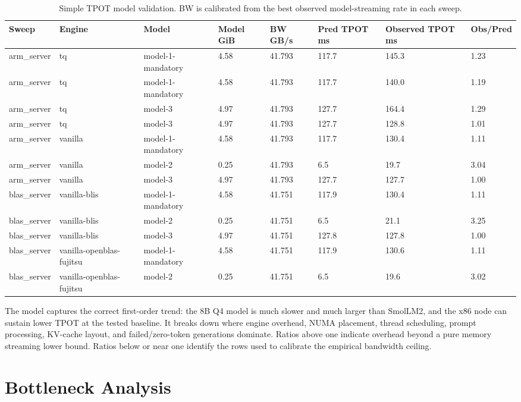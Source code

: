 \documentclass[11pt,a4paper]{article}
\begin{document}
\begin{table}[htbp]
\centering
\small
\begin{tabular}{llllllll}
\hline
Sweep & Engine & Model & Model GiB & BW GB/s & Pred TPOT ms & Observed TPOT ms & Obs/Pred \\
\hline
arm\_server & tq & model-1-mandatory & 4.58 & 41.793 & 117.7 & 145.3 & 1.23 \\
arm\_server & tq & model-1-mandatory & 4.58 & 41.793 & 117.7 & 140.0 & 1.19 \\
arm\_server & tq & model-3 & 4.97 & 41.793 & 127.7 & 164.4 & 1.29 \\
arm\_server & tq & model-3 & 4.97 & 41.793 & 127.7 & 128.8 & 1.01 \\
arm\_server & vanilla & model-1-mandatory & 4.58 & 41.793 & 117.7 & 130.4 & 1.11 \\
arm\_server & vanilla & model-2 & 0.25 & 41.793 & 6.5 & 19.7 & 3.04 \\
arm\_server & vanilla & model-3 & 4.97 & 41.793 & 127.7 & 127.7 & 1.00 \\
blas\_server & vanilla-blis & model-1-mandatory & 4.58 & 41.751 & 117.9 & 130.4 & 1.11 \\
blas\_server & vanilla-blis & model-2 & 0.25 & 41.751 & 6.5 & 21.1 & 3.25 \\
blas\_server & vanilla-blis & model-3 & 4.97 & 41.751 & 127.8 & 127.8 & 1.00 \\
blas\_server & vanilla-openblas-fujitsu & model-1-mandatory & 4.58 & 41.751 & 117.9 & 130.6 & 1.11 \\
blas\_server & vanilla-openblas-fujitsu & model-2 & 0.25 & 41.751 & 6.5 & 19.6 & 3.02 \\
\hline
\end{tabular}
\caption{Simple TPOT model validation. BW is calibrated from the best observed model-streaming rate in each sweep.}
\label{tab:model}
\end{table}

The model captures the correct first-order trend: the 8B Q4 model is much
slower and much larger than SmolLM2, and the x86 node can sustain lower TPOT at
the tested baseline. It breaks down where engine overhead, NUMA placement,
thread scheduling, prompt processing, KV-cache layout, and failed/zero-token
generations dominate. Ratios above one indicate overhead beyond a pure memory
streaming lower bound. Ratios below or near one identify the rows used to
calibrate the empirical bandwidth ceiling.

\section{Bottleneck Analysis}
\end{document}
